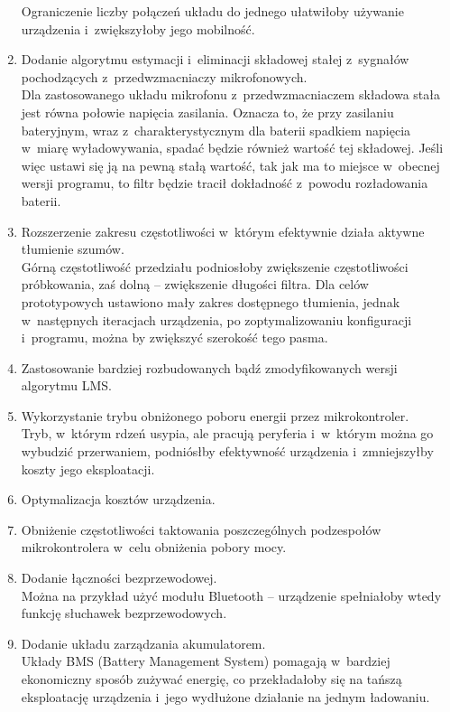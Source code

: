 \begin{enumerate}
\begin{itemize}
	\end{itemize}
	Ograniczenie liczby połączeń układu do jednego ułatwiłoby używanie urządzenia i~zwiększyłoby jego mobilność.
	\item Dodanie algorytmu estymacji i~eliminacji składowej stałej z~sygnałów pochodzących z~przedwzmacniaczy mikrofonowych.\\
	Dla zastosowanego układu mikrofonu z~przedwzmacniaczem składowa stała jest równa połowie napięcia zasilania. Oznacza to, że przy zasilaniu bateryjnym, wraz z~charakterystycznym dla baterii spadkiem napięcia w~miarę wyładowywania, spadać będzie również wartość tej składowej. Jeśli więc ustawi się ją na pewną stałą wartość, tak jak ma to miejsce w~obecnej wersji programu, to filtr będzie tracił dokładność z~powodu rozładowania baterii.
	\item Rozszerzenie zakresu częstotliwości w~którym efektywnie działa aktywne tłumienie szumów.\\
	Górną częstotliwość przedziału podniosłoby zwiększenie częstotliwości próbkowania, zaś dolną -- zwiększenie długości filtra. Dla celów prototypowych ustawiono mały zakres dostępnego tłumienia, jednak w~następnych iteracjach urządzenia, po zoptymalizowaniu konfiguracji i~programu, można by zwiększyć szerokość tego pasma.
	\item Zastosowanie bardziej rozbudowanych bądź zmodyfikowanych wersji algorytmu LMS.
	\item Wykorzystanie trybu obniżonego poboru energii przez mikrokontroler.\\
	Tryb, w~którym rdzeń usypia, ale pracują peryferia i~w~którym można go wybudzić przerwaniem, podniósłby efektywność urządzenia i~zmniejszyłby koszty jego eksploatacji.
	\item Optymalizacja kosztów urządzenia.
	\item Obniżenie częstotliwości taktowania poszczególnych podzespołów mikrokontrolera w~celu obniżenia pobory mocy.
	\item Dodanie łączności bezprzewodowej.\\
	Można  na przykład użyć modułu Bluetooth -- urządzenie spełniałoby wtedy funkcję słuchawek bezprzewodowych.
	\item Dodanie układu zarządzania akumulatorem.\\
	Układy BMS (Battery Management System) pomagają w~bardziej ekonomiczny sposób zużywać energię, co przekładałoby się na tańszą eksploatację urządzenia i~jego wydłużone działanie na jednym ładowaniu.
\end{enumerate}

